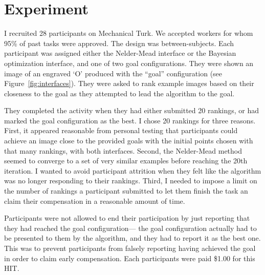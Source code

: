 \section{Experiment}

I recruited 28 participants on Mechanical Turk.
We accepted workers for whom 95\% of past tasks were approved.
The design was between-subjects.
Each participant was assigned either the Nelder-Mead interface or the Bayesian optimization interface, and one of two goal configurations.
They were shown an image of an engraved `O' produced with the ``goal'' configuration (see Figure~\ref{fig:interfaces}).
They were asked to rank example images based on their closeness to the goal as they attempted to lead the algorithm to the goal.

They completed the activity when they had either submitted 20 rankings, or had marked the goal configuration as the best.
I chose 20 rankings for three reasons.
First, it appeared reasonable from personal testing that participants could achieve an image close to the provided goals with the initial points chosen with that many rankings, with both interfaces.
Second, the Nelder-Mead method seemed to converge to a set of very similar examples before reaching the 20th iteration.
I wanted to avoid participant attrition when they felt like the algorithm was no longer responding to their rankings.
Third, I needed to impose a limit on the number of rankings a participant submitted to let them finish the task an claim their compensation in a reasonable amount of time.

Participants were not allowed to end their participation by just reporting that they had reached the goal configuration---%
the goal configuration actually had to be presented to them by the algorithm, and they had to report it as the best one.
This was to prevent participants from falsely reporting having achieved the goal in order to claim early compensation.
Each participants were paid \$1.00 for this HIT\@.

